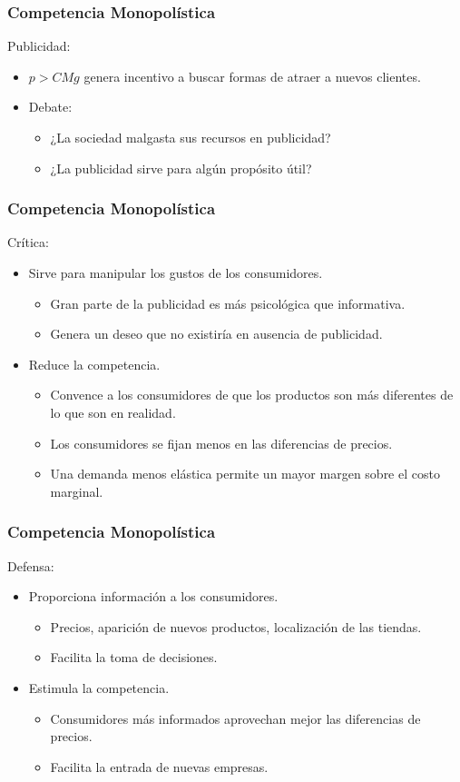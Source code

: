 \documentclass[dvipsnames,table,leqno]{beamer}
\begin{document}
		\begin{frame}
			\frametitle{Competencia Monopolística}
			Publicidad:
			\begin{itemize}
				\item $p>CMg$ genera incentivo a buscar formas de atraer a nuevos clientes.
				\item Debate:
					\begin{itemize}
						\item ¿La sociedad malgasta sus recursos en publicidad?
						\item ¿La publicidad sirve para algún propósito útil?
					\end{itemize}
			\end{itemize}
		\end{frame}		

		\begin{frame}
			\frametitle{Competencia Monopolística}
			Crítica:
			\begin{itemize}
				\item Sirve para manipular los gustos de los consumidores.
					\begin{itemize}
						\item Gran parte de la publicidad es más psicológica que informativa.
						\item Genera un deseo que no existiría en ausencia de publicidad.
					\end{itemize}
				\item Reduce la competencia.
					\begin{itemize}
						\item Convence a los consumidores de que los productos son más diferentes de lo que son en realidad.
						\item Los consumidores se fijan menos en las diferencias de precios.
						\item Una demanda menos elástica permite un mayor margen sobre el costo marginal.
					\end{itemize}
			\end{itemize}
		\end{frame}		
				
		\begin{frame}
			\frametitle{Competencia Monopolística}
			Defensa:
			\begin{itemize}
				\item Proporciona información a los consumidores.
					\begin{itemize}
						\item Precios, aparición de nuevos productos, localización de las tiendas.
						\item Facilita la toma de decisiones.
					\end{itemize}
				\item Estimula la competencia.
					\begin{itemize}
						\item Consumidores más informados aprovechan mejor las diferencias de precios.
						\item Facilita la entrada de nuevas empresas.
					\end{itemize}
			\end{itemize}
		\end{frame}		
\end{document}
